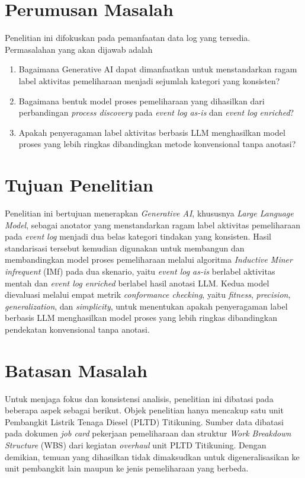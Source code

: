 \section{Perumusan Masalah}

Penelitian ini difokuskan pada pemanfaatan data log yang tersedia. Permasalahan yang akan dijawab adalah

\begin{enumerate}
    \item Bagaimana Generative AI dapat dimanfaatkan untuk menstandarkan ragam label aktivitas pemeliharaan menjadi sejumlah kategori yang konsisten?
    \item Bagaimana bentuk model proses pemeliharaan yang dihasilkan dari perbandingan \textit{process discovery} pada \textit{event log as-is} dan \textit{event log enriched}?
    \item Apakah penyeragaman label aktivitas berbasis LLM menghasilkan model proses yang lebih ringkas dibandingkan metode konvensional tanpa anotasi?
\end{enumerate}


\section{Tujuan Penelitian}

Penelitian ini bertujuan menerapkan \textit{Generative AI}, khususnya \textit{Large Language Model}, sebagai anotator yang menstandarkan ragam label aktivitas pemeliharaan pada \textit{event log} menjadi dua belas kategori tindakan yang konsisten. Hasil standarisasi tersebut kemudian digunakan untuk membangun dan membandingkan model proses pemeliharaan melalui algoritma \textit{Inductive Miner infrequent} (IMf) pada dua skenario, yaitu \textit{event log as-is} berlabel aktivitas mentah dan \textit{event log enriched} berlabel hasil anotasi LLM. Kedua model dievaluasi melalui empat metrik \textit{conformance checking}, yaitu \textit{fitness}, \textit{precision}, \textit{generalization}, dan \textit{simplicity}, untuk menentukan apakah penyeragaman label berbasis LLM menghasilkan model proses yang lebih ringkas dibandingkan pendekatan konvensional tanpa anotasi.

\section{Batasan Masalah}

Untuk menjaga fokus dan konsistensi analisis, penelitian ini dibatasi pada beberapa aspek sebagai berikut. Objek penelitian hanya mencakup satu unit Pembangkit Listrik Tenaga Diesel (PLTD) Titikuning. Sumber data dibatasi pada dokumen \textit{job card} pekerjaan pemeliharaan dan struktur \textit{Work Breakdown Structure} (WBS) dari kegiatan \textit{overhaul} unit PLTD Titikuning. Dengan demikian, temuan yang dihasilkan tidak dimaksudkan untuk digeneralisasikan ke unit pembangkit lain maupun ke jenis pemeliharaan yang berbeda.

